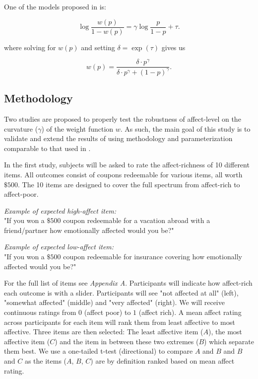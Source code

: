 \documentclass[12pt]{article}
\begin{document}
\vspace{3mm}

One of the models proposed in
\textcite{gonzalez1999shape} is:

\[
	\log\frac{w(p)}{1-w(p)} =
	\gamma \log\frac{p}{1-p} + \tau
.\]

where solving for $w(p)$ and setting $\delta = \exp(\tau)$
gives us

\[
	w(p) = \frac{\delta \cdot p^{\gamma}}
	{\delta \cdot p^{\gamma} +
	(1-p)^{\gamma}}
.\]

\subsection{Methodology}

Two studies are proposed to
properly test the robustness
of affect-level on the
curvature ($\gamma$) of the
weight function $w$. As such, the
main goal of this study is to validate
and extend the results of
\autocite{rottenstreich2001money}
using methodology and parameterization
comparable to that used in
\autocite{gonzalez1999shape}.

\vspace{3mm}

In the first study, subjects will be asked to
rate the affect-richness of 10 different
items.
All outcomes
consist of coupons redeemable
for various items, all worth $\$500$.
The 10 items are designed to cover the
full spectrum from affect-rich to
affect-poor.

\vspace{3mm}

\emph{Example of expected high-affect item:} \\
"If you won a $\$500$ coupon redeemable
for a vacation abroad with a friend/partner
how emotionally
affected would you be?"

\vspace{3mm}

\emph{Example of expected low-affect item:} \\
"If you won a $\$500$ coupon redeemable
for insurance covering how emotionally
affected would you be?"

\vspace{3mm}

For the full list of items see \emph{Appendix A}.
Participants
will indicate how affect-rich
each outcome is with a slider. Participants will
see "not affected at all" (left),
"somewhat affected" (middle)
and "very affected" (right).
We will receive continuous ratings from $0$
(affect poor) to $1$ (affect rich). A mean
affect rating across participants for each
item will rank them from least affective to
most affective. Three items are
then selected: The least affective item ($A$),
the most affective item ($C$) and the item in
between these two extremes ($B$) which separate them
best. We use a one-tailed t-test
(directional) to compare $A$ and  $B$
and  $B$ and  $C$ as the items ($A$,  $B$,  $C$)
are by definition ranked based on mean
affect rating.
\end{document}
